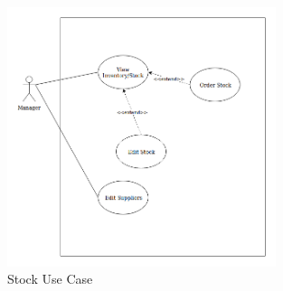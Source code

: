 \begin{figure}[!htb]
	\centering
	\includegraphics[width=0.7\textwidth]{stock_case}
	\caption{Stock Use Case}
	\label{fig:stockcase}
\end{figure}
